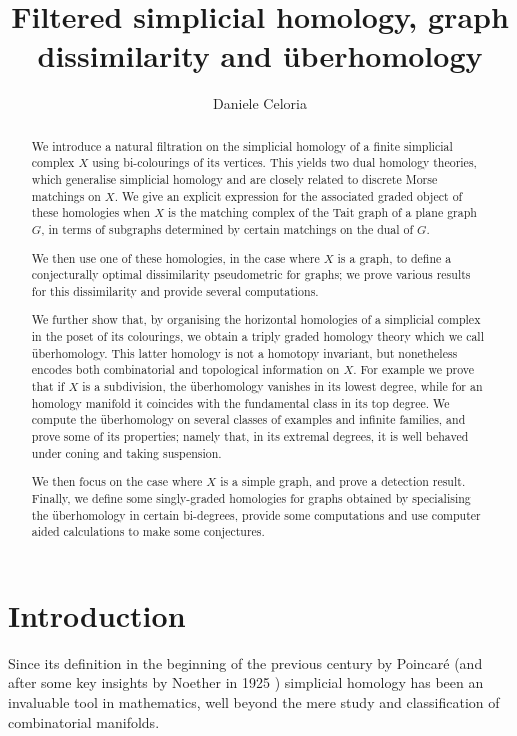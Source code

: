 \documentclass[11pt, a4paper, reqno, twoside, makeidx]{amsart}
\title{Filtered simplicial homology, graph dissimilarity and \"{u}berhomology}
\author{Daniele Celoria}
\date{}
\theoremstyle{remark}
\theoremstyle{plain}
\theoremstyle{definition}
\begin{document}
\maketitle





\begin{abstract}
We introduce a natural filtration on the simplicial homology of a finite simplicial complex $X$ using bi-colourings of its vertices. This yields two dual homology theories, which generalise simplicial homology and are closely related to discrete Morse matchings on $X$. We give an explicit expression for the associated graded object of these homologies when $X$ is the matching complex of the Tait graph of a plane graph $G$, in terms of subgraphs determined by certain matchings on the dual of $G$. 

We then use one of these homologies, in the case where $X$ is a graph, to define a conjecturally optimal dissimilarity pseudometric for graphs;  we prove various results for this dissimilarity and provide several computations.

We further show that, by organising the horizontal homologies of a simplicial complex in the poset of its colourings, we obtain a triply graded homology theory which we call \"uberhomology. This latter homology is not a homotopy invariant, but nonetheless encodes both combinatorial and topological information on $X$. For example we prove that if $X$ is a subdivision, the \"uberhomology vanishes in its lowest degree, while for an homology manifold it coincides with the fundamental class in its top degree.
We compute the \"uberhomology on several classes of examples and infinite families, and prove some of its properties; namely that, in its extremal degrees, it is well behaved under coning and taking suspension.

We then focus on the case where $X$ is a simple graph, and prove a detection result.  Finally, we define some singly-graded homologies for graphs obtained by specialising the \"uberhomology in certain bi-degrees,  provide some computations and use computer aided calculations to make some conjectures.
\end{abstract}

\section{Introduction}
Since its definition in the beginning of the previous century by Poincar\'e (and after some key insights by Noether in 1925 \cite{hilton1988brief}) simplicial homology has been an invaluable tool in mathematics, well beyond the mere study and classification of combinatorial manifolds.
\end{document}

